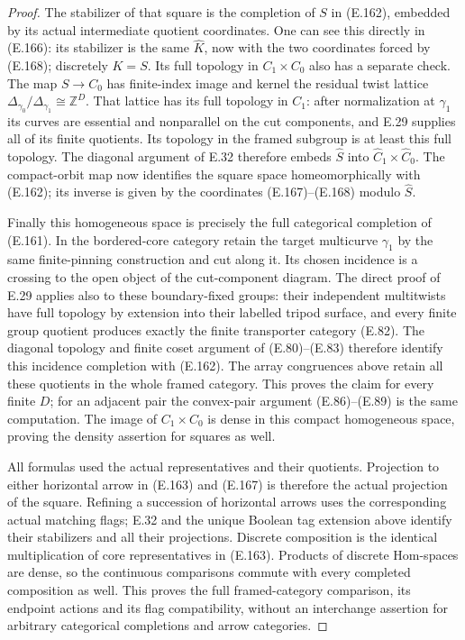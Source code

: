 \begin{proof}
The stabilizer of that square is the completion of $S$ in
(E.162), embedded by its actual intermediate quotient
coordinates.  One can see this directly in (E.166): its
stabilizer is the same $\widehat K$, now with the two
coordinates forced by (E.168); discretely $K=S$.
Its full topology in $C_1\times C_0$ also has a separate
check.  The map $S\to C_0$ has finite-index image and
kernel the residual twist lattice
$\Delta_{\gamma_0}/\Delta_{\gamma_1}\cong\mathbb Z^D$.
That lattice has its full topology in $C_1$: after
normalization at $\gamma_1$ its curves are essential and
nonparallel on the cut components, and E.29 supplies all
of its finite quotients.  Its topology in the framed
subgroup is at least this full topology.  The diagonal argument of
E.32 therefore embeds $\widehat S$ into
$\widehat C_1\times\widehat C_0$.  The compact-orbit map
now identifies the square space homeomorphically with
(E.162); its inverse is given by the coordinates
(E.167)--(E.168) modulo $\widehat S$.

Finally this homogeneous space is precisely the full
categorical completion of (E.161).  In the bordered-core
category retain the target multicurve $\gamma_1$ by the
same finite-pinning construction and cut along it.  Its
chosen incidence is a crossing to the open object of the
cut-component diagram.  The direct proof of E.29 applies
also to these boundary-fixed groups: their independent
multitwists have full topology by extension into their
labelled tripod surface, and every finite group quotient
produces exactly the finite transporter category (E.82).
The diagonal topology and finite coset argument of
(E.80)--(E.83) therefore identify this incidence completion
with (E.162).  The array congruences above retain all these
quotients in the whole framed category.  This proves the
claim for every finite $D$; for an adjacent pair the
convex-pair argument (E.86)--(E.89) is the same computation.
The image of $C_1\times C_0$ is dense in this compact
homogeneous space, proving the density assertion for
squares as well.

All formulas used the actual representatives and their
quotients.  Projection to either horizontal arrow in
(E.163) and (E.167) is therefore the actual projection of
the square.  Refining a succession of horizontal arrows
uses the corresponding actual matching flags; E.32 and
the unique Boolean tag extension above identify their
stabilizers and all their projections.  Discrete composition
is the identical multiplication of core representatives in
(E.163).  Products of discrete Hom-spaces are dense, so the
continuous comparisons commute with every completed
composition as well.  This proves the full framed-category
comparison, its endpoint actions and its flag compatibility,
without an interchange assertion for arbitrary categorical
completions and arrow categories.
\end{proof}
